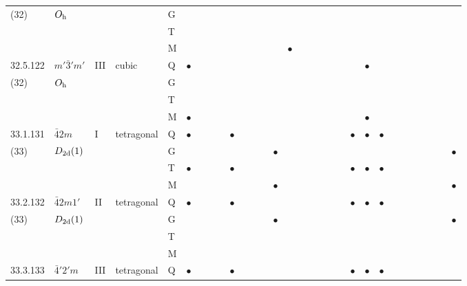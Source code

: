 \documentclass[fleqn,9pt,landscape]{jsarticle}
\begin{document}
\begin{longtable}{lllll|l|lll|ll|lll|l|lll|lll|l|ll|lll|lll}
(32) & $O_{\rm h}$ &  &  & G &  &  &  &  &  &  &  &  &  &  &  &  &  &  &  &  &  &  &  &  &  &  &  &  &  \\
 &  &  &  & T &  &  &  &  &  &  &  &  &  &  &  &  &  &  &  &  &  &  &  &  &  &  &  &  &  \\
 &  &  &  & M &  &  &  &  &  &  &  &  &  & $\bullet$ &  &  &  &  &  &  &  &  &  &  &  &  &  &  &  \\ \hline
32.5.122 & \texttt{$m'\bar{3}'m'$} & III & cubic & Q & $\bullet$ &  &  &  &  &  &  &  &  &  &  &  &  &  &  &  & $\bullet$ &  &  &  &  &  &  &  &  \\
(32) & $O_{\rm h}$ &  &  & G &  &  &  &  &  &  &  &  &  &  &  &  &  &  &  &  &  &  &  &  &  &  &  &  &  \\
 &  &  &  & T &  &  &  &  &  &  &  &  &  &  &  &  &  &  &  &  &  &  &  &  &  &  &  &  &  \\
 &  &  &  & M & $\bullet$ &  &  &  &  &  &  &  &  &  &  &  &  &  &  &  & $\bullet$ &  &  &  &  &  &  &  &  \\ \hline
33.1.131 & \texttt{$\bar{4}2m$} & I & tetragonal & Q & $\bullet$ &  &  &  & $\bullet$ &  &  &  &  &  &  &  &  &  &  & $\bullet$ & $\bullet$ & $\bullet$ &  &  &  &  &  &  &  \\
(33) & $D_{\rm 2d}(1)$ &  &  & G &  &  &  &  &  &  &  &  & $\bullet$ &  &  &  &  &  &  &  &  &  &  &  &  &  &  &  & $\bullet$ \\
 &  &  &  & T & $\bullet$ &  &  &  & $\bullet$ &  &  &  &  &  &  &  &  &  &  & $\bullet$ & $\bullet$ & $\bullet$ &  &  &  &  &  &  &  \\
 &  &  &  & M &  &  &  &  &  &  &  &  & $\bullet$ &  &  &  &  &  &  &  &  &  &  &  &  &  &  &  & $\bullet$ \\ \hline
33.2.132 & \texttt{$\bar{4}2m1'$} & II & tetragonal & Q & $\bullet$ &  &  &  & $\bullet$ &  &  &  &  &  &  &  &  &  &  & $\bullet$ & $\bullet$ & $\bullet$ &  &  &  &  &  &  &  \\
(33) & $D_{\rm 2d}(1)$ &  &  & G &  &  &  &  &  &  &  &  & $\bullet$ &  &  &  &  &  &  &  &  &  &  &  &  &  &  &  & $\bullet$ \\
 &  &  &  & T &  &  &  &  &  &  &  &  &  &  &  &  &  &  &  &  &  &  &  &  &  &  &  &  &  \\
 &  &  &  & M &  &  &  &  &  &  &  &  &  &  &  &  &  &  &  &  &  &  &  &  &  &  &  &  &  \\ \hline
33.3.133 & \texttt{$\bar{4}'2'm$} & III & tetragonal & Q & $\bullet$ &  &  &  & $\bullet$ &  &  &  &  &  &  &  &  &  &  & $\bullet$ & $\bullet$ & $\bullet$ &  &  &  &  &  &  &  \\

\end{longtable}
\end{document}
